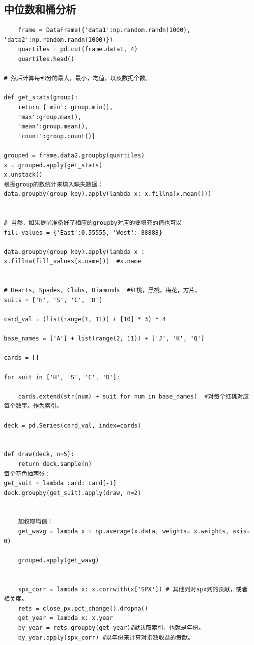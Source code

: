 \documentclass{article}
\begin{document}
\subsection{中位数和桶分析}
\begin{lstlisting}
	frame = DataFrame({'data1':np.random.randn(1000), 'data2':np.random.randn(1000)})
	quartiles = pd.cut(frame.data1, 4)
	quartiles.head()
	
# 然后计算每部分的最大，最小，均值，以及数据个数。

def get_stats(group):
	return {'min': group.min(),
	'max':group.max(),
	'mean':group.mean(),
	'count':group.count()}

grouped = frame.data2.groupby(quartiles)
x = grouped.apply(get_stats)
x.unstack()
根据group的数统计来填入缺失数据：
data.groupby(group_key).apply(lambda x: x.fillna(x.mean())) 


# 当然，如果提前准备好了相应的groupby对应的要填充的值也可以
fill_values = {'East':0.55555, 'West':-88888}

data.groupby(group_key).apply(lambda x : x.fillna(fill_values[x.name]))  #x.name


# Hearts, Spades, Clubs, Diamonds  #红桃，黑桃。梅花，方片。
suits = ['H', 'S', 'C', 'D']

card_val = (list(range(1, 11)) + [10] * 3) * 4

base_names = ['A'] + list(range(2, 11)) + ['J', 'K', 'Q']

cards = []

for suit in ['H', 'S', 'C', 'D']:

	cards.extend(str(num) + suit for num in base_names)  #对每个红桃对应每个数字。作为索引。

deck = pd.Series(card_val, index=cards)


def draw(deck, n=5):
	return deck.sample(n)
每个花色抽两张：
get_suit = lambda card: card[-1]
deck.groupby(get_suit).apply(draw, n=2)
	
	
	加权取均值：
	get_wavg = lambda x : np.average(x.data, weights= x.weights, axis= 0)
	
	grouped.apply(get_wavg)
	
	
	spx_corr = lambda x: x.corrwith(x['SPX']) # 其他列对spx列的贡献，或者相关度。
	rets = close_px.pct_change().dropna()
	get_year = lambda x: x.year 
	by_year = rets.groupby(get_year)#默认取索引，也就是年份。
	by_year.apply(spx_corr) #以年份来计算对指数收益的贡献。
\end{lstlisting}
\end{document}
